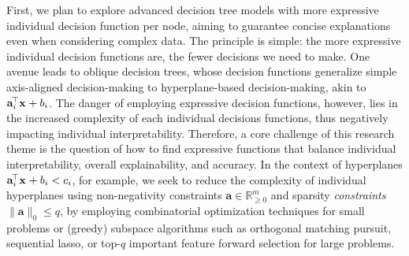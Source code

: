 \documentclass[a4paper,11pt]{article}
\begin{document}
First, we plan to explore advanced decision tree models with more expressive individual decision function per node, aiming to guarantee concise explanations even when considering complex data.
The principle is simple: the more expressive individual decision functions are, the fewer decisions we need to make. 
One avenue leads to oblique decision trees, whose decision functions generalize simple axis-aligned decision-making to hyperplane-based decision-making, akin to $\mathbf{a}_i^{\!\top} \mathbf{x}^{\vphantom{\top}}_{\vphantom{i}} + b_i$. %
The danger of employing expressive decision functions, however, lies in the increased complexity of each individual decisions functions, thus negatively impacting individual interpretability.
Therefore, a core challenge of this research theme is the question of how to find expressive functions that balance individual interpretability, overall explainability, and accuracy.
In the context of hyperplanes $\mathbf{a}_i^{\!\top} \mathbf{x}^{\vphantom{\top}}_{\vphantom{i}} + b_i < c_i$, for example, we seek to reduce the complexity of individual hyperplanes using non-negativity constraints $\mathbf{a} \in \mathbb{R}^m_{\geq 0}$ and sparsity \emph{constraints} $\|\mathbf{a}\|_0 \leq q$, by employing combinatorial optimization techniques for small problems or (greedy) subspace algorithms such as orthogonal matching pursuit, sequential lasso, or top-$q$ important feature forward selection for large problems.
\end{document}
